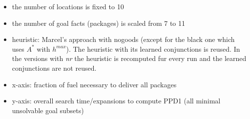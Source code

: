 \begin{itemize}
	\item the number of locations is fixed to 10
	\item the number of goal facts (packages) is scaled from 7 to 11
	\item heuristic: Marcel's approach with nogoods (except for the black one which uses $A^*$ with $h^{max}$).
		The heuristic with its learned conjunctions is reused. In the versions with \textit{nr} the heuristic is recomputed 
		fur every run and the learned conjunctions are not reused.
	\item x-axis: fraction of fuel necessary to deliver all packages
	\item y-axis: overall search time/expansions to compute PPD1 (all minimal unsolvable goal subsets)
\end{itemize}

